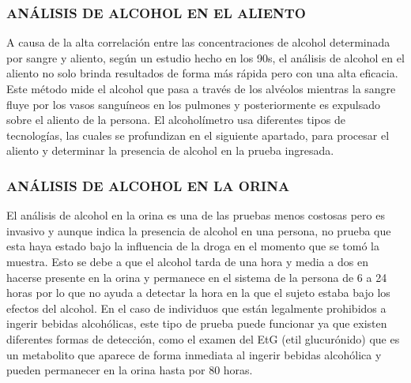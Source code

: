 \subsubsection{ANÁLISIS DE ALCOHOL EN EL ALIENTO}
A causa de la alta correlación entre las concentraciones de alcohol determinada por sangre y aliento, según un estudio hecho en los 90s, el análisis de alcohol en el aliento no solo brinda resultados de forma más rápida pero con una alta eficacia. Este método mide el alcohol que pasa a través de los alvéolos mientras la sangre fluye por los vasos sanguíneos en los pulmones y posteriormente es expulsado sobre el aliento de la persona.  El alcoholímetro usa diferentes tipos de tecnologías, las cuales se profundizan en el siguiente apartado, para procesar el aliento y determinar la presencia de alcohol en la prueba ingresada.
\subsubsection{ANÁLISIS DE ALCOHOL EN LA ORINA}
El análisis de alcohol en la orina es una de las pruebas menos costosas pero es invasivo y aunque indica la presencia de alcohol en una persona, no prueba que esta haya estado bajo la influencia de la droga en el momento que se tomó la muestra. Esto se debe a que el alcohol tarda de una hora y media a dos en hacerse presente en la orina y permanece en el sistema de la persona de 6 a 24 horas por lo que no ayuda a detectar la hora en la que el sujeto estaba bajo los efectos del alcohol. En el caso de individuos que están legalmente prohibidos a ingerir bebidas alcohólicas, este tipo de prueba puede funcionar ya que existen diferentes formas de detección, como el examen del EtG (etil glucurónido) que es un metabolito que aparece de forma inmediata al ingerir bebidas alcohólica y pueden permanecer en la orina hasta por 80 horas.
